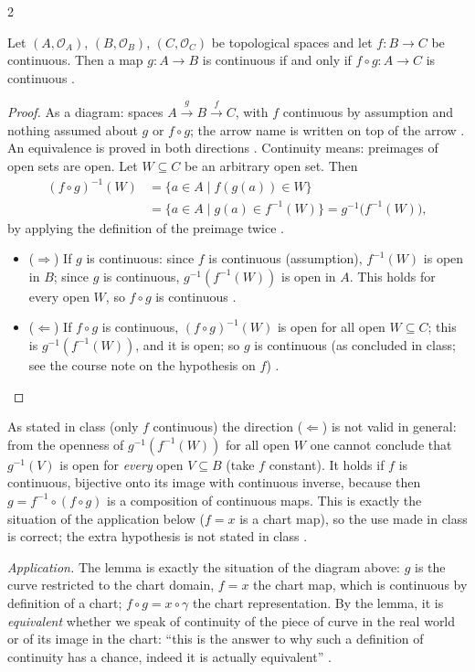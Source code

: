 \begin{paracol}{2}
\begin{theorem}\label{thm:dm-lemma}
Let $(A,\mathcal O_A)$, $(B,\mathcal O_B)$, $(C,\mathcal O_C)$ be topological spaces and let $f\colon B\to C$ be continuous.
Then a map $g\colon A\to B$ is continuous if and only if $f\circ g\colon A\to C$ is continuous
.
\end{theorem}
\begin{proof}
As a diagram: spaces $A\xrightarrow{g}B\xrightarrow{f}C$, with $f$ continuous by assumption and nothing assumed about $g$ or
$f\circ g$; the arrow name is written on top of the arrow . An equivalence is proved
in both directions . Continuity means: preimages of open sets are open. Let $W\subseteq C$ be
an arbitrary open set. Then
\begin{align*}
  (f\circ g)^{-1}(W)&=\{a\in A\mid f(g(a))\in W\}\\
  &=\{a\in A\mid g(a)\in f^{-1}(W)\}=g^{-1}\bigl(f^{-1}(W)\bigr),
\end{align*}
by applying the definition of the preimage twice .
\begin{itemize}
  \item ($\Rightarrow$) If $g$ is continuous: since $f$ is continuous (assumption), $f^{-1}(W)$ is open in $B$; since $g$ is
        continuous, $g^{-1}(f^{-1}(W))$ is open in $A$. This holds for every open $W$, so $f\circ g$ is continuous
        .
  \item ($\Leftarrow$) If $f\circ g$ is continuous, $(f\circ g)^{-1}(W)$ is open for all open $W\subseteq C$; this is
        $g^{-1}(f^{-1}(W))$, and it is open; so $g$ is continuous (as concluded in class; see the course note on the
        hypothesis on $f$) .
\end{itemize}
\end{proof}
\begin{coursenote}
As stated in class (only $f$ continuous) the direction ($\Leftarrow$) is not valid in general: from the openness of
$g^{-1}(f^{-1}(W))$ for all open $W$ one cannot conclude that $g^{-1}(V)$ is open for \emph{every} open $V\subseteq B$
(take $f$ constant). It holds if $f$ is continuous, bijective onto its image with continuous inverse, because then
$g=f^{-1}\circ(f\circ g)$ is a composition of continuous maps. This is exactly the situation of the application below
($f=x$ is a chart map), so the use made in class is correct; the extra hypothesis is not stated in class
.
\end{coursenote}
\emph{Application.} The lemma is exactly the situation of the diagram above: $g$ is the curve restricted to the chart
domain, $f=x$ the chart map, which is continuous by definition of a chart; $f\circ g=x\circ\gamma$ the chart
representation. By the lemma, it is \emph{equivalent} whether we speak of continuity of the piece of curve in the real
world or of its image in the chart: ``this is the answer to why such a definition of continuity has a chance, indeed it
is actually equivalent'' .


\end{paracol}
